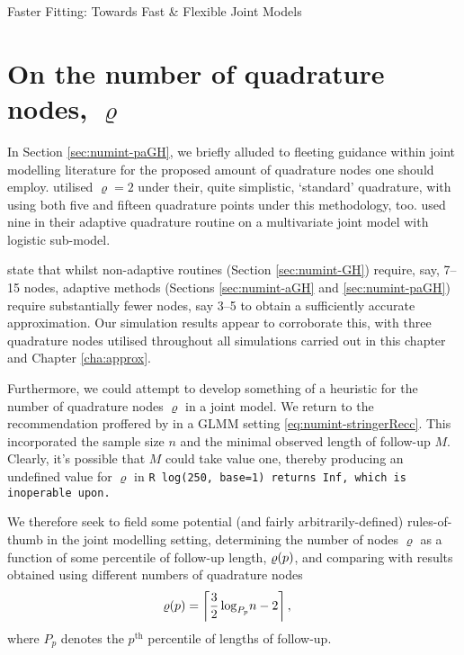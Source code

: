 \begin{chapter}{\label{cha:flexible}Faster Fitting: Towards Fast \& Flexible Joint Models}
\section{On the number of quadrature nodes, \texorpdfstring{$\varrho$}{rho}}\label{sec:flexible-quadrature-intro}
In Section \ref{sec:numint-paGH}, we briefly alluded to fleeting guidance within joint modelling literature for the proposed amount of quadrature nodes one should employ. \citet{Wulfsohn97} utilised $\varrho=2$ under their, quite simplistic, `standard' quadrature, with \citet{Crowther2016} using both five and fifteen quadrature points under this methodology, too. \citet{Bernhardt15} used nine in their adaptive quadrature routine on a multivariate joint model with logistic sub-model.

\citet{Rizopoulos2012} state that whilst non-adaptive routines (\eg Section \ref{sec:numint-GH}) require, say, 7--15 nodes, adaptive methods (Sections \ref{sec:numint-aGH} and \ref{sec:numint-paGH}) require substantially fewer nodes, say 3--5 to obtain a sufficiently accurate approximation. Our simulation results appear to corroborate this, with three quadrature nodes utilised throughout all simulations carried out in this chapter and Chapter \ref{cha:approx}.

Furthermore, we could attempt to develop something of a heuristic for the number of quadrature nodes $\varrho$ in a joint model. We return to the recommendation proffered by \citet{Stringer2022} in a GLMM setting \eqref{eq:numint-stringerRecc}. This incorporated the sample size $n$ and the minimal observed length of follow-up $M$. Clearly, it's possible that $M$ could take value one, thereby producing an undefined value for $\varrho$ \ie in \tt{R} \tt{log(250, base=1)} returns \tt{Inf}, which is inoperable upon. 

We therefore seek to field some potential (and fairly arbitrarily-defined) rules-of-thumb in the joint modelling setting, determining the number of nodes $\varrho$ as a function of some percentile of follow-up length, $\varrho\!\left( p\right)$, and comparing with results obtained using different numbers of quadrature nodes
\begin{equation}
    \begin{aligned}
        \varrho\!\left( p\right)&=\left\lceil\frac{3}{2}\log_{P_p}\!n-2\right\rceil,
    \end{aligned}
\label{eq:rho-heuristic}
\end{equation}
where $P_p$ denotes the $p^{\mathrm{th}}$ percentile of lengths of follow-up. 


\end{chapter}
